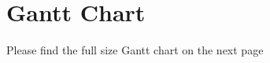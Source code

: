 \appendix
\chapter{Gantt Chart} \label{an1}
Please find the full size Gantt chart on the next page

